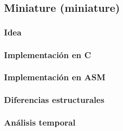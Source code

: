 \subsection{Miniature (miniature)}
	\subsubsection{Idea}
	\subsubsection{Implementaci\'on en C}
	\subsubsection{Implementaci\'on en ASM}
	\subsubsection{Diferencias estructurales}
	\subsubsection{An\'alisis temporal}
